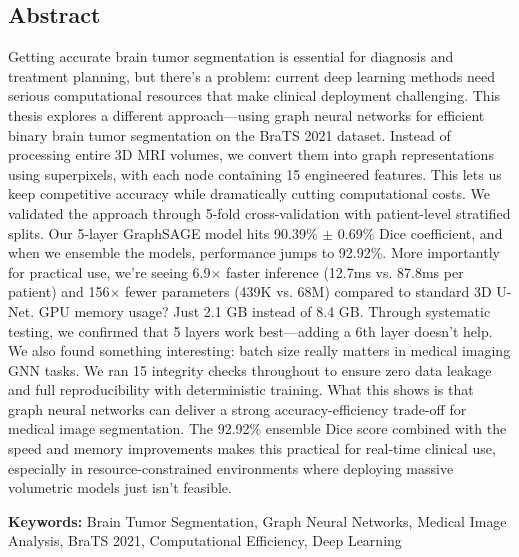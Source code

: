 \begin{center}
    \section*{Abstract}
\end{center}

Getting accurate brain tumor segmentation is essential for diagnosis and treatment planning, but there's a problem: current deep learning methods need serious computational resources that make clinical deployment challenging. This thesis explores a different approach—using graph neural networks for efficient binary brain tumor segmentation on the BraTS 2021 dataset. Instead of processing entire 3D MRI volumes, we convert them into graph representations using superpixels, with each node containing 15 engineered features. This lets us keep competitive accuracy while dramatically cutting computational costs. We validated the approach through 5-fold cross-validation with patient-level stratified splits. Our 5-layer GraphSAGE model hits 90.39\% $\pm$ 0.69\% Dice coefficient, and when we ensemble the models, performance jumps to 92.92\%. More importantly for practical use, we're seeing 6.9$\times$ faster inference (12.7ms vs. 87.8ms per patient) and 156$\times$ fewer parameters (439K vs. 68M) compared to standard 3D U-Net. GPU memory usage? Just 2.1 GB instead of 8.4 GB. Through systematic testing, we confirmed that 5 layers work best—adding a 6th layer doesn't help. We also found something interesting: batch size really matters in medical imaging GNN tasks. We ran 15 integrity checks throughout to ensure zero data leakage and full reproducibility with deterministic training. What this shows is that graph neural networks can deliver a strong accuracy-efficiency trade-off for medical image segmentation. The 92.92\% ensemble Dice score combined with the speed and memory improvements makes this practical for real-time clinical use, especially in resource-constrained environments where deploying massive volumetric models just isn't feasible.

\textbf{Keywords:} Brain Tumor Segmentation, Graph Neural Networks, Medical Image Analysis, BraTS 2021, Computational Efficiency, Deep Learning
